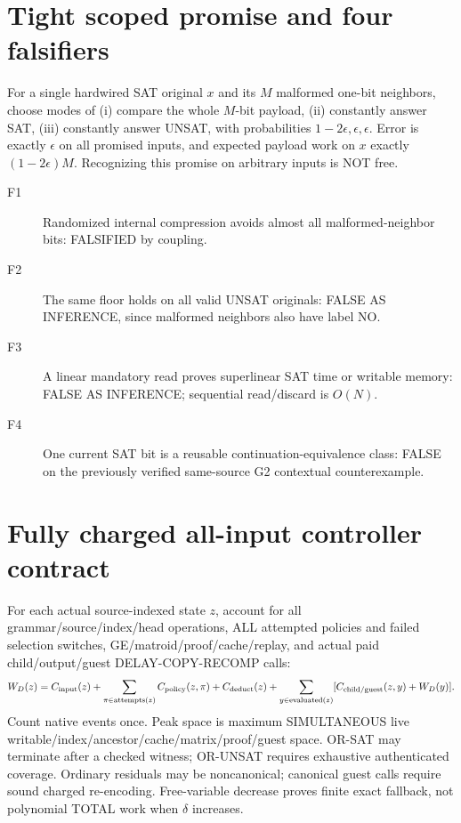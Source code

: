 \documentclass[11pt]{article}
\begin{document}
\section{Tight scoped promise and four falsifiers}
For a single hardwired SAT original $x$ and its $M$ malformed one-bit neighbors, choose modes of (i) compare the whole $M$-bit payload, (ii) constantly answer SAT, (iii) constantly answer UNSAT, with probabilities $1-2\epsilon,\epsilon,\epsilon$. Error is exactly $\epsilon$ on all promised inputs, and expected payload work on $x$ exactly $(1-2\epsilon)M$. Recognizing this promise on arbitrary inputs is NOT free.
\begin{description}
\item[F1] Randomized internal compression avoids almost all malformed-neighbor bits: FALSIFIED by coupling.
\item[F2] The same floor holds on all valid UNSAT originals: FALSE AS INFERENCE, since malformed neighbors also have label NO.
\item[F3] A linear mandatory read proves superlinear SAT time or writable memory: FALSE AS INFERENCE; sequential read/discard is $O(N)$.
\item[F4] One current SAT bit is a reusable continuation-equivalence class: FALSE on the previously verified same-source G2 contextual counterexample.
\end{description}
\section{Fully charged all-input controller contract}
For each actual source-indexed state $z$, account for all grammar/source/index/head operations, ALL attempted policies and failed selection switches, GE/matroid/proof/cache/replay, and actual paid child/output/guest DELAY-COPY-RECOMP calls:
\[
W_D(z)=C_{\rm input}(z)+\sum_{\pi\in\operatorname{attempts}(z)}C_{\rm policy}(z,\pi)
+C_{\rm deduct}(z)+\sum_{y\in\operatorname{evaluated}(z)}[C_{\rm child/guest}(z,y)+W_D(y)].
\]
Count native events once. Peak space is maximum SIMULTANEOUS live writable/index/ancestor/cache/matrix/proof/guest space. OR-SAT may terminate after a checked witness; OR-UNSAT requires exhaustive authenticated coverage. Ordinary residuals may be noncanonical; canonical guest calls require sound charged re-encoding. Free-variable decrease proves finite exact fallback, not polynomial TOTAL work when $\delta$ increases.
\end{document}

